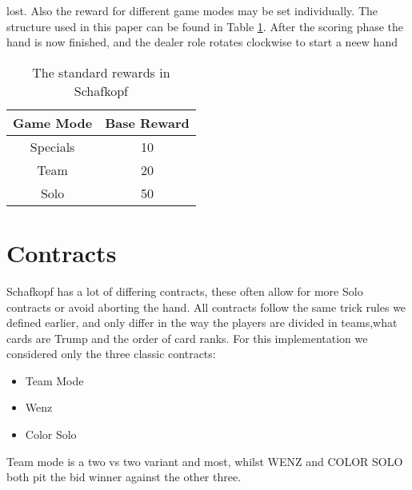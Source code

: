 lost.
Also the reward for different game modes may be set individually.
The structure used in this paper can be found in Table \ref{tab:rewardsStrucutre}.
After the scoring phase the hand is now finished, and the dealer role rotates clockwise to start a neew hand
\begin{table}[h!]
    \centering
    \begin{tabular}{cc}
        \toprule
        Game Mode & Base Reward \\
        \midrule
        Specials  & 10          \\
        Team      & 20          \\
        Solo      & 50          \\
        \bottomrule
\end{tabular}
    \caption{The standard rewards in Schafkopf}
    \label{tab:rewardsStrucutre}
\end{table}


\section{Contracts}
Schafkopf has a lot of differing contracts, these often allow for more Solo contracts or avoid aborting the hand.
All contracts follow the same trick rules we defined earlier, and only differ in the way the players are divided in
teams,what cards are Trump and the order of card ranks.
For this implementation we considered only the three classic contracts:
\begin{itemize}
    \item Team Mode
    \item Wenz
    \item Color Solo
\end{itemize}
Team mode is a two vs two variant and most, whilst WENZ and COLOR SOLO both pit the bid winner against the other three.

